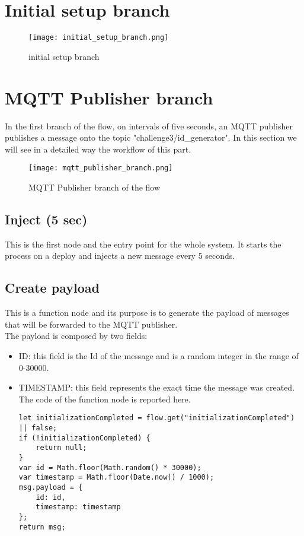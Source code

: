 \section{Initial setup branch}
\label{sec:initial_setup_branch}
\begin{figure}[H]
    \centering
    \texttt{[image: initial\_setup\_branch.png]}
    \caption{initial setup branch}
\end{figure}


\section{MQTT Publisher branch}
\label{sec:publisher_branch}
In the first branch of the flow, on intervals of five seconds, an MQTT publisher publishes a message onto the topic "challenge3/id\_generator". In this section we will see in a detailed way the workflow of this part.
\begin{figure}[H]
    \centering
    \texttt{[image: mqtt\_publisher\_branch.png]}
    \caption{MQTT Publisher branch of the flow}
\end{figure}

\subsection{Inject (5 sec)}
This is the first node and the entry point for the whole system. It starts the process on a deploy and injects a new message every 5 seconds.

\subsection{Create payload}
This is a function node and its purpose is to generate the payload of messages that will be forwarded to the MQTT publisher. \\
The payload is composed by two fields:
\begin{itemize}
\item ID: this field is the Id of the message and is a random integer in the range of 0-30000.
\item TIMESTAMP: this field represents the exact time the message was created.
The code of the function node is reported here.
\begin{verbatim}
let initializationCompleted = flow.get("initializationCompleted") || false;
if (!initializationCompleted) {
    return null;    
}
var id = Math.floor(Math.random() * 30000);
var timestamp = Math.floor(Date.now() / 1000);
msg.payload = {
    id: id,
    timestamp: timestamp
};
return msg;
\end{verbatim}
\end{itemize}

